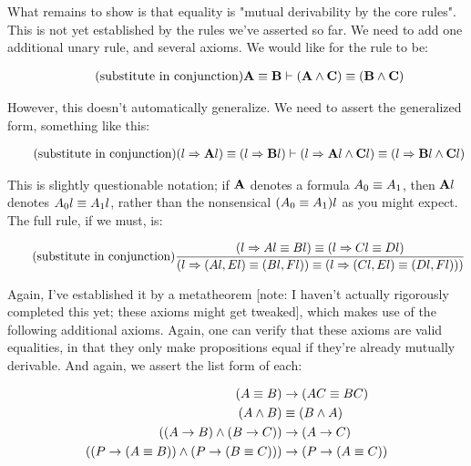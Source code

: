 \documentclass{article}
\begin{document}
  What remains to show is that equality is "mutual derivability by the core rules". This is not yet established by the rules we've asserted so far. We need to add one additional unary rule, and several axioms. We would like for the rule to be:
  
  \begin{align*}
    \tag{substitute in conjunction}\label{subst_c1}
    \mathbf{A} \equiv \mathbf{B} &\vdash (\mathbf{A} \wedge \mathbf{C}) \equiv (\mathbf{B} \wedge \mathbf{C}) \\
  \end{align*}
  
  However, this doesn't automatically generalize. We need to assert the generalized form, something like this:
  
  \begin{align*}
    \tag{substitute in conjunction}\label{subst_c}
    (l \Rightarrow \mathbf{A}l) \equiv (l \Rightarrow \mathbf{B}l) &\vdash (l \Rightarrow \mathbf{A}l \wedge \mathbf{C}l) \equiv (l \Rightarrow \mathbf{B}l \wedge \mathbf{C}l) \\
  \end{align*}
  
  This is slightly questionable notation; if $\mathbf{A}$ denotes a formula $A_0 \equiv A_1$, then $\mathbf{A}l$ denotes $A_0l \equiv A_1l$, rather than the nonsensical $(A_0 \equiv A_1)l$ as you might expect. The full rule, if we must, is:
      
  \begin{align*}
    \tag{substitute in conjunction}\label{subst_c3}
    \frac{(l \Rightarrow Al \equiv Bl) \equiv (l \Rightarrow Cl \equiv Dl)}{(l \Rightarrow (Al,El) \equiv (Bl,Fl)) \equiv (l \Rightarrow (Cl,El) \equiv (Dl,Fl)))} \\
  \end{align*}
  
  Again, I've established it by a metatheorem [note: I haven't actually rigorously completed this yet; these axioms might get tweaked], which makes use of the following additional axioms. Again, one can verify that these axioms are valid equalities, in that they only make propositions equal if they're already mutually derivable. And again, we assert the list form of each:
  
  \begin{align*}
    (A \equiv B) &\to (AC \equiv BC)\\
    (A \wedge B) &\equiv (B \wedge A)\\
    ((A \to B) \wedge (B \to C)) &\to (A \to C)\\
    ((P \to (A \equiv B)) \wedge (P \to (B \equiv C))) &\to (P \to (A \equiv C))\\
  \end{align*}
  
\end{document}
